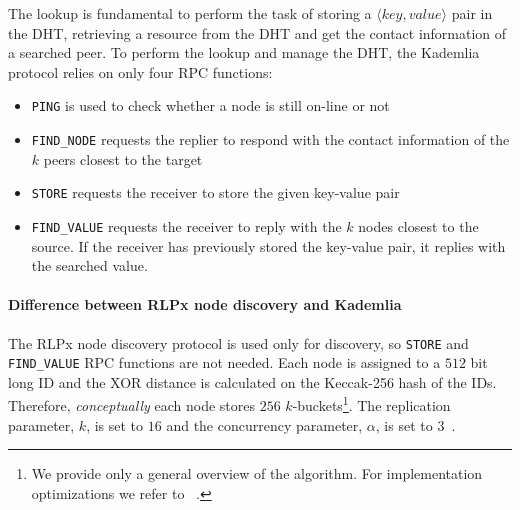 The lookup is fundamental to perform the task of storing a $\langle key,
value\rangle$ pair in the DHT, retrieving a resource from the DHT and get the
contact information of a searched peer. To perform the lookup and manage the
DHT, the Kademlia protocol relies on only four RPC functions:
\begin{itemize}
    \item \verb|PING| is used to check whether a node is still on-line or not
    \item \verb|FIND_NODE| requests the replier to respond with the contact
    information of the $k$ peers closest to the target
    \item \verb|STORE| requests the receiver to store the given key-value pair
    \item \verb|FIND_VALUE| requests the receiver to reply with the $k$ nodes
    closest to the source. If the receiver has previously stored the key-value
    pair, it replies with the searched value.
\end{itemize}


\paragraph{Difference between RLPx node discovery and Kademlia}
\label{sec:rlpx-discovery}
The RLPx node discovery protocol is used only for discovery, so \verb|STORE| and
\verb|FIND_VALUE| RPC functions are not needed. Each node is assigned to a $512$
bit long ID and the XOR distance is calculated on the Keccak-256 hash of the
IDs. Therefore, \emph{conceptually} each node stores $256$
$k$-buckets\footnote{We provide only a general overview of the algorithm. For
implementation optimizations we refer to ~\cite{bib:kademlia}.}. The replication
parameter, $k$, is set to $16$ and the concurrency parameter, $\alpha$, is set
to $3$~\cite{bib:rlpx-discovery-protocol}.

